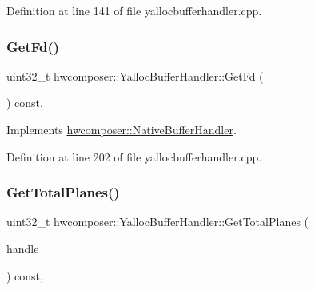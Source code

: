Definition at line 141 of file yallocbufferhandler.\+cpp.


\begin{DoxyCode}{0}
\end{DoxyCode}
\mbox{\label{classhwcomposer_1_1YallocBufferHandler_a793b507e933f4cd256ea37e302152bb4}} 
\subsubsection{\texorpdfstring{Get\+Fd()}{GetFd()}}
{\footnotesize\ttfamily uint32\+\_\+t hwcomposer\+::\+Yalloc\+Buffer\+Handler\+::\+Get\+Fd (\begin{DoxyParamCaption}{ }\end{DoxyParamCaption}) const\hspace{0.3cm}{\ttfamily [override]}, {\ttfamily [virtual]}}



Implements \mbox{\hyperlink{classhwcomposer_1_1NativeBufferHandler_adb5a4c6d14c012f8a5c71fbb2c984438}{hwcomposer\+::\+Native\+Buffer\+Handler}}.



Definition at line 202 of file yallocbufferhandler.\+cpp.


\begin{DoxyCode}{0}
\end{DoxyCode}
\mbox{\label{classhwcomposer_1_1YallocBufferHandler_a257b6f65f6c57915ecabb0b6ecd43237}} 
\subsubsection{\texorpdfstring{Get\+Total\+Planes()}{GetTotalPlanes()}}
{\footnotesize\ttfamily uint32\+\_\+t hwcomposer\+::\+Yalloc\+Buffer\+Handler\+::\+Get\+Total\+Planes (\begin{DoxyParamCaption}\item[{\mbox{\hyperlink{alios_2platformdefines_8h_ac0a2eaf260f556d17fe489911f017bdf}{H\+W\+C\+Native\+Handle}}}]{handle }\end{DoxyParamCaption}) const\hspace{0.3cm}{\ttfamily [override]}, {\ttfamily [virtual]}}



